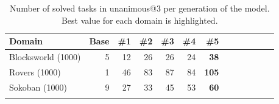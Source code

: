  \begin{table}[t!]
\begin{center}
\caption{Average number of solved tasks per generation of the model. Average over three runs. Total of 1000 tasks per domain. Best value for each domain is highlighted.}
\label{tab:solved}
\end{center}
\end{table}


\begin{table}[t!]
\begin{center}
\begin{tabular}{lrrrrrrrrrrcr}
\toprule
Domain             & Base & \#1 & \#2 & \#3 & \#4 & \#5          \\
\midrule
Blocksworld (1000) & 5    & 12  & 26  & 26  & 24  & \textbf{38}  \\
Rovers (1000)      & 1    & 46  & 83  & 87  & 84  & \textbf{105} \\
Sokoban (1000)     & 9    & 27  & 33  & 45  & 53  & \textbf{60}  \\
\bottomrule                                                      \\
\end{tabular}
\caption{Number of solved tasks in unanimous@3 per generation of the model. Best value for each
  domain is highlighted.}
\label{tab:unanimousn}
\end{center}
\end{table}

